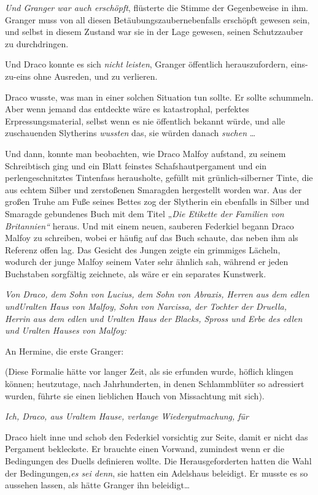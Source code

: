 {\emph{Und Granger war auch erschöpft}, flüsterte die Stimme der Gegenbeweise in ihm. Granger muss von all diesen Betäubungszaubernebenfalls erschöpft gewesen sein, und selbst in diesem Zustand war sie in der Lage gewesen, seinen Schutzzauber zu durchdringen.

Und Draco konnte es sich \emph{nicht leisten}, Granger öffentlich herauszufordern, eins-zu-eins ohne Ausreden, und zu verlieren.

Draco wusste, was man in einer solchen Situation tun sollte. Er sollte schummeln. Aber wenn jemand das entdeckte wäre es katastrophal, perfektes Erpressungsmaterial, selbst wenn es nie öffentlich bekannt würde, und alle zuschauenden Slytherins \emph{wussten} das, sie würden danach \emph{suchen} …

Und dann, konnte man beobachten, wie Draco Malfoy aufstand, zu seinem Schreibtisch ging und ein Blatt feinstes Schafshautpergament und ein perlengeschnitztes Tintenfass herausholte, gefüllt mit grünlich-silberner Tinte, die aus echtem Silber und zerstoßenen Smaragden hergestellt worden war. Aus der großen Truhe am Fuße seines Bettes zog der Slytherin ein ebenfalls in Silber und Smaragde gebundenes Buch mit dem Titel „\emph{Die Etikette der Familien von Britannien“} heraus. Und mit einem neuen, sauberen Federkiel begann Draco Malfoy zu schreiben, wobei er häufig auf das Buch schaute, das neben ihm als Referenz offen lag. Das Gesicht des Jungen zeigte ein grimmiges Lächeln, wodurch der junge Malfoy seinem Vater sehr ähnlich sah, während er jeden Buchstaben sorgfältig zeichnete, als wäre er ein separates Kunstwerk.

\emph{Von Draco, dem Sohn von Lucius, dem Sohn von Abraxis, Herren aus dem edlen undUralten Haus von Malfoy, Sohn von Narcissa, der Tochter der Druella, Herrin aus dem edlen und Uralten Haus der Blacks, Spross und Erbe des edlen und Uralten Hauses von Malfoy:}

An Hermine, die erste Granger:

(Diese Formalie hätte vor langer Zeit, als sie erfunden wurde, höflich klingen können; heutzutage, nach Jahrhunderten, in denen Schlammblüter so adressiert wurden, führte sie einen lieblichen Hauch von Missachtung mit sich).

\emph{Ich, Draco, aus Uraltem Hause, verlange Wiedergutmachung, für}

Draco hielt inne und schob den Federkiel vorsichtig zur Seite, damit er nicht das Pergament bekleckste. Er brauchte einen Vorwand, zumindest wenn er die Bedingungen des Duells definieren wollte. Die Herausgeforderten hatten die Wahl der Bedingungen,\emph{es sei denn}, sie hatten ein Adelshaus beleidigt. Er musste es so aussehen lassen, als hätte Granger ihn beleidigt…

}
